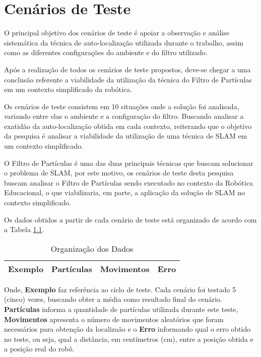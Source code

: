 \chapter[Cenários de Teste]{Cenários de Teste}
\label{sec:cenarios_teste}
O principal objetivo dos cenários de teste é apoiar a observação e análise sistemática da técnica de auto-localização utilizada durante o trabalho, assim como as diferentes configurações do ambiente e
do filtro utilizado.

Após a realização de todos os cenários de teste propostos, deve-se chegar a uma conclusão referente a viabilidade da utilização da técnica do Filtro de Partículas em um contexto simplificado da robótica.

Os cenários de teste consistem em 10 situações onde a solução foi analisada, variando entre elas o ambiente e a configuração do filtro. Buscando
analisar a exatidão da auto-localização obtida em cada contexto, reiterando que o objetivo da pesquisa é analisar a viabilidade da utilização
de uma técnica de SLAM em um contexto simplificado.

O Filtro de Partículas é uma das duas principais técnicas que buscam solucionar o problema
de SLAM, por este motivo, os cenários de teste desta pesquisa buscam analisar o Filtro de Partículas sendo executado no contexto da Robótica
Educacional, o que viabilizaria, em parte, a aplicação da solução de SLAM no contexto simplificado.

Os dados obtidos a partir de cada cenário de teste está organizado de acordo com a Tabela \ref{tab:org_dados}.

\begin{table}[H]
  \centering
  \caption{Organização dos Dados}
  \label{tab:org_dados}
  \begin{tabular}{|c|c|c|c|}
  \hline
  \textbf{Exemplo} & \textbf{Partículas} & \textbf{Movimentos} & \textbf{Erro} \\ \hline
  \end{tabular}
\end{table}

Onde, \textbf{Exemplo} faz referência ao ciclo de teste. Cada cenário foi testado 5 (cinco) vezes, buscando obter a média como resultado
final do cenário. \textbf{Partículas} informa a quantidade de partículas utilizada durante este teste, \textbf{Movimentos} apresenta
o número de movimentos aleatórios que foram necessários para obtenção da localizaão e o \textbf{Erro} informando qual o erro obtido no teste, ou seja,
qual a distância, em centímetros (cm), entre a posição obtida e a posição real do robô.
